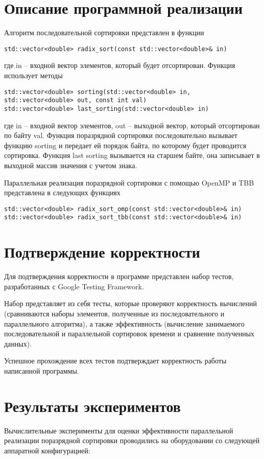 \documentclass{report}
\begin{document}
\section*{Описание программной реализации}
Алгоритм последовательной сортировки представлен в функции
\begin{lstlisting}
std::vector<double> radix_sort(const std::vector<double>& in)
\end{lstlisting}
где in – входной вектор элементов, который будет отсортирован. Функция использует методы
\begin{lstlisting}
std::vector<double> sorting(std::vector<double> in, std::vector<double> out, const int val)
std::vector<double> last_sorting(std::vector<double> in)
\end{lstlisting}
где in – входной вектор элементов, out – выходной вектор, который отсортирован по байту val. Функция поразрядной сортировки последовательно вызывает функцию sorting и передает ей порядок байта, по которому будет проводится сортировка. Функция last sorting вызывается на старшем байте, она записывает в выходной массив значения с учетом знака.
\par Параллельная реализация поразрядной сортировки с помощью OpenMP и TBB представлена в следующих функциях
\begin{lstlisting}
std::vector<double> radix_sort_omp(const std::vector<double>& in)
std::vector<double> radix_sort_tbb(const std::vector<double>& in)
\end{lstlisting}
\newpage

\section*{Подтверждение корректности}
Для подтверждения корректности в программе представлен набор тестов, разработанных с Google Testing Framework.
\par Набор представляет из себя тесты, которые проверяют корректность вычислений (сравниваются наборы элементов, полученные из последовательного и параллельного алгоритма), а также эффективность (вычисление занимаемого последовательной и параллельной сортировок времени и сравнение полученных данных).
\par Успешное прохождение всех тестов подтверждает корректность работы написанной программы.
\newpage


\section*{Результаты экспериментов}
Вычислительные эксперименты для оценки эффективности параллельной реализации поразрядной сортировки проводились на оборудовании со следующей аппаратной конфигурацией:
\end{document}
